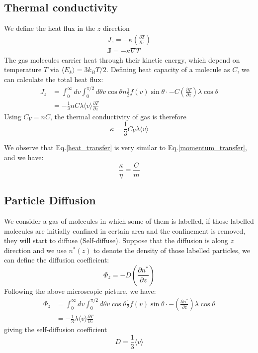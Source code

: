 \documentclass{article}
\begin{document}
\subsection*{Thermal conductivity}
We define the heat flux in the $z$ direction
\begin{gather}
    J_z = -\kappa \left( \frac{\partial T}{\partial z} \right) \\
    \mathbf{J} = -\kappa \nabla T
\end{gather}
The gas molecules carrier heat through their kinetic energy, which depend on temperature $T$ via $\langle E_k \rangle = 3k_BT / 2$. Defining heat capacity of a 
molecule as $C$, we can calculate the total heat flux:
\begin{align}
    J_z &= \int_0^{\infty} dv \int_0^{\pi/2} d\theta 
    v \cos \theta n \frac{1}{2} f(v) \sin\theta \cdot - C \left( \frac{\partial T}{\partial z} \right) \lambda \cos\theta \\
    &= -\frac{1}{3} n C \lambda \langle v \rangle \frac{\partial T}{\partial z} \label{heat_transfer}
\end{align}
Using $C_V = n C$, the thermal conductivity of gas is therefore
\begin{equation}
    \kappa = \frac{1}{3} C_V \lambda \langle v \rangle
\end{equation}

We observe that Eq.\ref{heat_transfer} is very similar to Eq.\ref{momentum_transfer}, and we have:
\begin{equation}
    \frac{\kappa}{\eta} = \frac{C}{m}
\end{equation} 

\subsection*{Particle Diffusion}
We consider a gas of molecules in which some of them is labelled, if those labelled molecules are initially confined in 
certain area and the confinement is removed, they will start to diffuse (Self-diffuse). Suppose that the diffusion is 
along $z$ direction and we use $n^*(z)$ to denote the density of those labelled particles, we can define the 
diffusion coefficient: 
\begin{equation}
    \Phi_z = -D \left( \frac{\partial n^*}{\partial z} \right)
\end{equation}
Following the above microscopic picture, we have:
\begin{align}
    \Phi_z &= \int_0^{\infty} dv \int_0^{\pi/2} d\theta 
    v \cos \theta \frac{1}{2} f(v) \sin\theta \cdot - \left( \frac{\partial n^*}{\partial z} \right) \lambda \cos\theta \\
    &= -\frac{1}{3} \lambda \langle v \rangle \frac{\partial T}{\partial z} 
\end{align}
giving the self-diffusion coefficient
\begin{equation}
    D = \frac{1}{3} \langle v \rangle
\end{equation}
\end{document}
